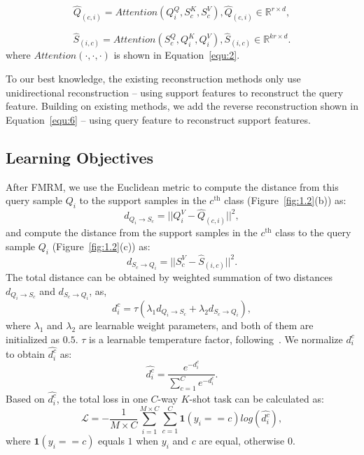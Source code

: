 \documentclass[letterpaper]{article} %
\begin{document}
\begin{equation}
\hat{Q}_{(c, i)} = Attention(Q_i^Q, S_c^K, S_c^V), \hat{Q}_{(c, i)} \in \mathbb{R}^{r\times d},
\label{equ:5}
\end{equation}

\begin{equation}
\hat{S}_{(i, c)} = Attention(S_c^Q, Q_i^K, Q_i^V), \hat{S}_{(i, c)}\in \mathbb{R}^{kr\times d}.
\label{equ:6}
\end{equation}
where $Attention(\cdot, \cdot, \cdot)$ is shown in Equation~\ref{equ:2}.

To our best knowledge, the existing reconstruction methods only use unidirectional reconstruction -- using support features to reconstruct the query feature. Building on existing methods, we add the reverse reconstruction shown in Equation~\ref{equ:6} -- using query feature to reconstruct support features.

\subsection{Learning Objectives}



After FMRM, we use the {Euclidean} metric to compute the distance from this query sample $Q_i$ to the support samples in the $c^\text{th}$ class (Figure~\ref{fig:1.2}(b)) as:
\begin{equation}
d_{Q_i \to S_c} = ||Q_i^V - \hat{Q}_{(c, i)}||^2,
\label{equ:7}
\end{equation}
and compute the distance from the support samples in the $c^\text{th}$ class to the query sample $Q_i$ (Figure~\ref{fig:1.2}(c)) as: 
\begin{equation}
d_{S_c \to Q_i} = ||S_c^V - \hat{S}_{(i, c)}||^2.
\label{equ:8}
\end{equation}
The total distance can be obtained by weighted summation of two distances $d_{Q_i \to S_c}$ and $d_{S_c \to Q_i}$, as, 
\begin{equation}
d_i^c = \tau(\lambda_1 d_{Q_i \to S_c} + \lambda_2 d_{S_c \to Q_i}),
\label{equ:9}
\end{equation}
where $\lambda_1$ and $\lambda_2$ are learnable weight parameters, and both of them are initialized as $0.5$. $\tau$ is a learnable temperature factor, following~\cite{Wertheimer_2021_CVPR, Ye_2020_CVPR, Chen2020ANM, Gidaris2018DynamicFV}.  
We normalize $d_i^c$ to obtain $\hat{d_i^c}$ as:
\begin{equation}
\hat{d_i^c} = \frac{e^{-d_i^c}}{\sum_{c=1}^C e^{-d_i^c}}.
\end{equation}
Based on $\hat{d_i^c}$, the total loss in one $C$-way $K$-shot task can be calculated as:
\begin{equation}
\mathcal{L} = -\frac{1}{M \times C} \sum_{i=1}^{M \times C} \sum_{c=1}^C \textbf{1}(y_ i==c) log(\hat{d_i^c}),
\end{equation}
where $\textbf{1}(y_i==c)$ equals $1$ when $y_i$ and $c$ are equal, otherwise $0$.
\end{document}
